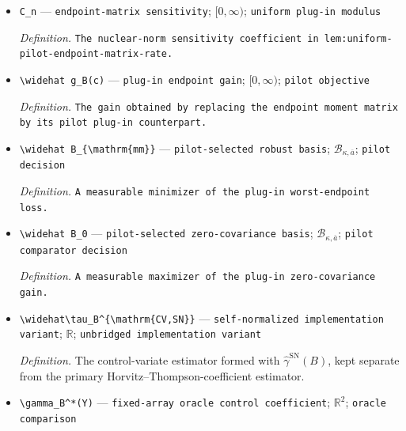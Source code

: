 \documentclass{article}
\begin{document}
\begin{itemize}
  \par\smallskip\noindent\emph{Definition.} \texttt{The plug-\allowbreak{}in endpoint matrix obtained from the two empirical pilot marginals.}
  \item \texttt{C\_\allowbreak{}n} --- \texttt{endpoint-\allowbreak{}matrix sensitivity}; \([0,\infty)\); \texttt{uniform plug-\allowbreak{}in modulus}
  \par\smallskip\noindent\emph{Definition.} \texttt{The nuclear-\allowbreak{}norm sensitivity coefficient in lem:\allowbreak{}uniform-\allowbreak{}pilot-\allowbreak{}endpoint-\allowbreak{}matrix-\allowbreak{}rate.}
  \item \texttt{\textbackslash{}\allowbreak{}widehat g\_\allowbreak{}B(c)} --- \texttt{plug-\allowbreak{}in endpoint gain}; \([0,\infty)\); \texttt{pilot objective}
  \par\smallskip\noindent\emph{Definition.} \texttt{The gain obtained by replacing the endpoint moment matrix by its pilot plug-\allowbreak{}in counterpart.}
  \item \texttt{\textbackslash{}\allowbreak{}widehat B\_\allowbreak{}\{\textbackslash{}\allowbreak{}mathrm\{mm\}\allowbreak{}\}\allowbreak{}} --- \texttt{pilot-\allowbreak{}selected robust basis}; \(\mathcal B_{\kappa,\overline a}\); \texttt{pilot decision}
  \par\smallskip\noindent\emph{Definition.} \texttt{A measurable minimizer of the plug-\allowbreak{}in worst-\allowbreak{}endpoint loss.}
  \item \texttt{\textbackslash{}\allowbreak{}widehat B\_\allowbreak{}0} --- \texttt{pilot-\allowbreak{}selected zero-\allowbreak{}covariance basis}; \(\mathcal B_{\kappa,\overline a}\); \texttt{pilot comparator decision}
  \par\smallskip\noindent\emph{Definition.} \texttt{A measurable maximizer of the plug-\allowbreak{}in zero-\allowbreak{}covariance gain.}
  \item \texttt{\textbackslash{}\allowbreak{}widehat\textbackslash{}\allowbreak{}tau\_\allowbreak{}B\textasciicircum{}\{\textbackslash{}\allowbreak{}mathrm\{CV,\allowbreak{}SN\}\allowbreak{}\}\allowbreak{}} --- \texttt{self-\allowbreak{}normalized implementation variant}; \(\mathbb R\); \texttt{unbridged implementation variant}
  \par\smallskip\noindent\emph{Definition.} The control-variate estimator formed with \(\widehat\gamma^{\mathrm{SN}}(B)\), kept separate from the primary Horvitz--Thompson-coefficient estimator.
  \item \texttt{\textbackslash{}\allowbreak{}gamma\_\allowbreak{}B\textasciicircum{}*(Y)} --- \texttt{fixed-\allowbreak{}array oracle control coefficient}; \(\mathbb R^2\); \texttt{oracle comparison}

\end{itemize}
\end{document}
